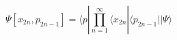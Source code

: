 \begin{equation}\Psi[x_{2n},p_{2n-1}]=\langle p|\prod_{n=1}^\infty \langle
x_{2n}|\langle p_{2n-1}| |\Psi\rangle
\label{eq:field}\end{equation} 
